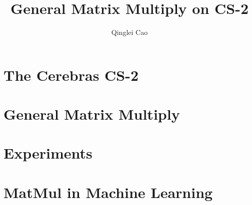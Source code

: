 \documentclass[journal,12pt,onecolumn,draftclsnofoot]{IEEEtran}
\begin{document}

\title{General Matrix Multiply on CS-2}

\author[1,2]{Qinglei Cao}


\maketitle

%


\section{The Cerebras CS-2}
\label{sec:intro}

\section{General Matrix Multiply}
\label{sec:gemm}

\section{\master}
\label{sec:master}

\section{\summa}
\label{sec:summa}

\section{Experiments}
\label{sec:perf}

\section{MatMul in Machine Learning}
\label{sec:ml}
%
\end{document}
